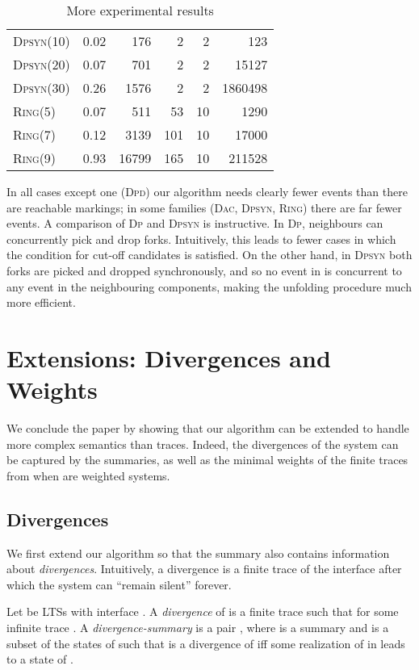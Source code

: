 \documentclass{llncs}
\begin{document}
\begin{table}[ht]
\begin{center}
\begin{tabular}{lrrrrr}
\midrule
\textsc{Dpsyn}(10) & 0.02 &  176 & 2 & 2 &     123 \\
\textsc{Dpsyn}(20) & 0.07 &  701 & 2 & 2 &   15127 \\
\textsc{Dpsyn}(30) & 0.26 & 1576 & 2 & 2 & 1860498 \\
\midrule
\textsc{Ring}(5) & 0.07 &   511 &  53 & 10 &   1290 \\
\textsc{Ring}(7) & 0.12 &  3139 & 101 & 10 &  17000 \\
\textsc{Ring}(9) & 0.93 & 16799 & 165 & 10 & 211528 \\
\end{tabular}
\caption{More experimental results}
\label{tab:expfull}
\end{center}
\end{table}

In all cases except one (\textsc{Dpd}) our algorithm needs clearly 
fewer events than there are reachable markings;
in some families (\textsc{Dac},
\textsc{Dpsyn}, \textsc{Ring}) there are far fewer events.
A comparison of \textsc{Dp} and \textsc{Dpsyn} is instructive. In \textsc{Dp},
neighbours can concurrently pick and drop forks. Intuitively, this leads
to fewer cases in which the condition 
for cut-off candidates is satisfied. On the other hand, in \textsc{Dpsyn} both forks are
picked and dropped synchronously, and so no event in  is concurrent to any
event in the neighbouring components, making the unfolding procedure much
more efficient. 


\section{Extensions: Divergences and  Weights}

We conclude the paper by showing that our algorithm can be extended to handle more complex semantics than traces.
Indeed, the divergences of the system can be captured by the summaries, as well as the minimal weights of the finite traces from  when  are weighted systems.

\subsection{Divergences}
We first extend our algorithm so that the summary
also contains information about {\em divergences}.
Intuitively, a divergence is a finite trace of the interface after which
the system can ``remain silent'' forever.

\begin{definition}
Let  be LTSs with interface . A 
{\em divergence} of  is a finite trace
 such that  for some
infinite trace .
A {\em divergence-summary} is a pair , where  is a summary 
and  is a subset of the states of  such that 
is a divergence of  if{}f some realization of  in  
leads to a state of . 
\end{definition}
\end{document}
